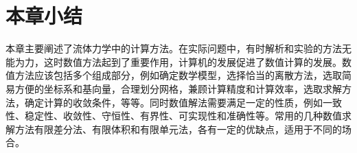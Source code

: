
\section{本章小结}

本章主要阐述了流体力学中的计算方法。在实际问题中，有时解析和实验的方法无能为力，这时数值方法起到了重要作用，计算机的发展促进了数值计算的发展。数值方法应该包括多个组成部分，例如确定数学模型，选择恰当的离散方法，选取简易方便的坐标系和基向量，合理划分网格，兼顾计算精度和计算效率，选取求解方法，确定计算的收敛条件，等等。同时数值解法需要满足一定的性质，例如一致性、稳定性、收敛性、守恒性、有界性、可实现性和准确性等。常用的几种数值求解方法有限差分法、有限体积和有限单元法，各有一定的优缺点，适用于不同的场合。
